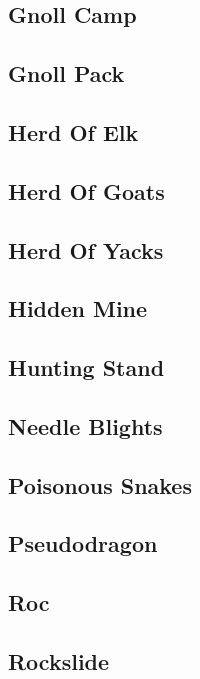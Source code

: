 \subsection{Gnoll Camp}

\subsection{Gnoll Pack}

\subsection{Herd Of Elk}

\subsection{Herd Of Goats}

\subsection{Herd Of Yacks}

\subsection{Hidden Mine}

\subsection{Hunting Stand}

\subsection{Needle Blights}

\subsection{Poisonous Snakes}

\subsection{Pseudodragon}

\subsection{Roc}

\subsection{Rockslide}

